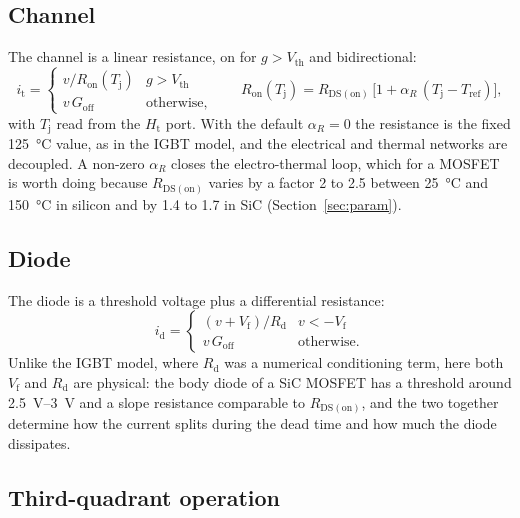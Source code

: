 \documentclass[11pt,a4paper]{article}
\newcommand{\Rdson}{R_{\mathrm{DS(on)}}}
\newcommand{\Tj}{T_{\mathrm{j}}}
\newcommand{\Ht}{H_{\mathrm{t}}}
\begin{document}
\subsection{Channel}

The channel is a linear resistance, on for $g > V_\mathrm{th}$ and bidirectional:
\begin{equation}
i_\mathrm{t} =
\begin{cases}
 v / R_\mathrm{on}(\Tj) & g > V_\mathrm{th} \\
 v\, G_\mathrm{off}     & \text{otherwise},
\end{cases}
\qquad
R_\mathrm{on}(\Tj) = \Rdson\,\bigl[1 + \alpha_R\,(\Tj - T_\mathrm{ref})\bigr],
\label{eq:channel}
\end{equation}
with $\Tj$ read from the $\Ht$ port. With the default $\alpha_R = 0$ the
resistance is the fixed \SI{125}{\celsius} value, as in the IGBT model, and the
electrical and thermal networks are decoupled. A non-zero $\alpha_R$ closes the
electro-thermal loop, which for a MOSFET is worth doing because $\Rdson$
varies by a factor 2 to 2.5 between \SI{25}{\celsius} and \SI{150}{\celsius}
in silicon and by 1.4 to 1.7 in SiC (Section~\ref{sec:param}).

\subsection{Diode}

The diode is a threshold voltage plus a differential resistance:
\begin{equation}
i_\mathrm{d} =
\begin{cases}
 (v + V_\mathrm{f}) / R_\mathrm{d} & v < -V_\mathrm{f} \\
 v\, G_\mathrm{off}                & \text{otherwise}.
\end{cases}
\label{eq:diode}
\end{equation}
Unlike the IGBT model, where $R_\mathrm{d}$ was a numerical conditioning
term, here both $V_\mathrm{f}$ and $R_\mathrm{d}$ are physical: the body diode
of a SiC MOSFET has a threshold around \SIrange{2.5}{3}{\volt} and a slope
resistance comparable to $\Rdson$, and the two together determine how the
current splits during the dead time and how much the diode dissipates.

\subsection{Third-quadrant operation}
\label{sec:3q}
\end{document}
